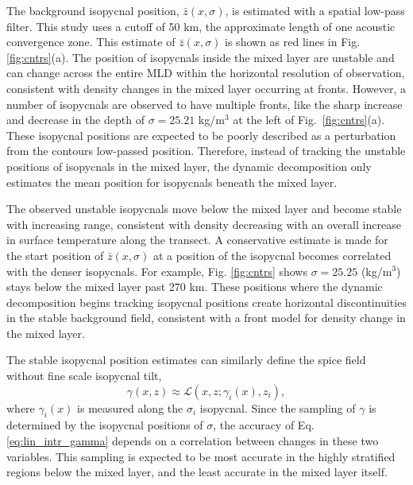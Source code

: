 \documentclass[preprint,NumberedRefs]{JASA}
\begin{document}
The background isopycnal position, $\bar{z}(x, \sigma)$, is estimated with a spatial low-pass filter. This study uses a cutoff of 50 km, the approximate length of one acoustic convergence zone\cite{jensen2011computational}. This estimate of $\bar{z}(x, \sigma)$ is shown as red lines in Fig. \ref{fig:cntrs}(a). The position of isopycnals inside the mixed layer are unstable and can change across the entire MLD within the horizontal resolution of observation, consistent with density changes in the mixed layer occurring at fronts. However, a number of isopycnals are observed to have multiple fronts, like the sharp increase and decrease in the depth of $\sigma=25.21$ kg/m$^3$ at the left of Fig.~\ref{fig:cntrs}(a). These isopycnal positions are expected to be poorly described as a perturbation from the contours low-passed position. Therefore, instead of tracking the unstable positions of isopycnals in the mixed layer, the dynamic decomposition only estimates the mean position for isopycnals beneath the mixed layer.

The observed unstable isopycnals move below the mixed layer and become stable with increasing range, consistent with density decreasing with an overall increase in surface temperature along the transect. A conservative estimate is made for the start position of $\bar{z}(x, \sigma)$ at a position of the isopycnal becomes correlated with the denser isopycnals. For example, Fig. \ref{fig:cntrs} shows $\sigma=25.25$ (kg/m$^3$) stays below the mixed layer past 270 km. These positions where the dynamic decomposition begins tracking isopycnal positions create horizontal discontinuities in the stable background field, consistent with a front model for density change in the mixed layer.

The stable isopycnal position estimates can similarly define the spice field without fine scale isopycnal tilt,
\begin{equation}
    \gamma(x, z)\approx\mathcal{L}(x, z; \gamma_i(x), z_i),
    \label{eq:lin_intr_gamma}
\end{equation}
where $\gamma_i(x)$ is measured along the $\sigma_i$ isopycnal. Since the sampling of $\gamma$ is determined by the isopycnal positions of $\sigma$, the accuracy of Eq. \eqref{eq:lin_intr_gamma} depends on a correlation between changes in these two variables. This sampling is expected to be most accurate in the highly stratified regions below the mixed layer, and the least accurate in the mixed layer itself.
\end{document}
